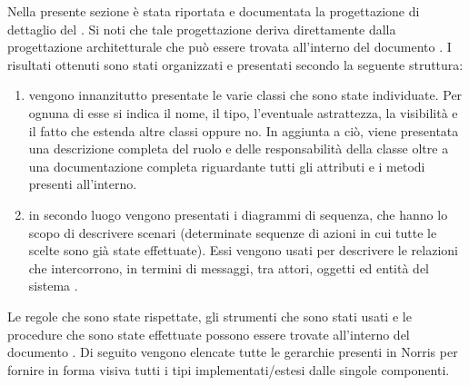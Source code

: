 	Nella presente sezione è stata riportata e documentata la progettazione di dettaglio del  . Si noti che tale progettazione deriva direttamente dalla progettazione architetturale che può essere trovata all'interno del documento . I risultati ottenuti sono stati organizzati e presentati secondo la seguente struttura:
	\begin{enumerate}
		\item vengono innanzitutto presentate le varie classi che sono state individuate. Per ognuna di esse si indica il nome, il tipo, l'eventuale astrattezza, la visibilità e il fatto che estenda altre classi oppure no. In aggiunta a ciò, viene presentata una descrizione completa del ruolo e delle responsabilità della classe oltre a una documentazione completa riguardante tutti gli attributi e i metodi presenti all'interno.
		\item in secondo luogo vengono presentati i diagrammi di sequenza, che hanno lo scopo di descrivere scenari (determinate sequenze di azioni in cui tutte le scelte sono già state effettuate). Essi vengono usati per descrivere le relazioni che intercorrono, in termini di messaggi, tra attori, oggetti ed entità del sistema .
	\end{enumerate}
	Le regole che sono state rispettate, gli strumenti che sono stati usati e le procedure che sono state effettuate possono essere trovate all'interno del documento .
		Di seguito vengono elencate tutte le gerarchie presenti in Norris per fornire in forma visiva tutti i tipi implementati/estesi dalle singole componenti.
